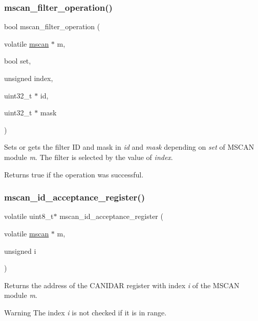 \subsubsection{\texorpdfstring{mscan\_filter\_operation()}{mscan\_filter\_operation()}}
{\footnotesize\ttfamily bool mscan\+\_\+filter\+\_\+operation (\begin{DoxyParamCaption}\item[{volatile \mbox{\hyperlink{group__RTEMSBSPsPowerPCGen5200MSCAN_gacfd56a4a482c5e7da2cff003284b2d51}{mscan}} $\ast$}]{m,  }\item[{bool}]{set,  }\item[{unsigned}]{index,  }\item[{uint32\+\_\+t $\ast$}]{id,  }\item[{uint32\+\_\+t $\ast$}]{mask }\end{DoxyParamCaption})}



Sets or gets the filter ID and mask in {\itshape id} and {\itshape mask} depending on {\itshape set} of M\+S\+C\+AN module {\itshape m}. The filter is selected by the value of {\itshape index}. 

Returns true if the operation was successful. \mbox{\label{group__RTEMSBSPsPowerPCGen5200MSCAN_gadfc7768cf5d070c658a72c4c4a52ec48}} 
\subsubsection{\texorpdfstring{mscan\_id\_acceptance\_register()}{mscan\_id\_acceptance\_register()}}
{\footnotesize\ttfamily volatile uint8\+\_\+t$\ast$ mscan\+\_\+id\+\_\+acceptance\+\_\+register (\begin{DoxyParamCaption}\item[{volatile \mbox{\hyperlink{group__RTEMSBSPsPowerPCGen5200MSCAN_gacfd56a4a482c5e7da2cff003284b2d51}{mscan}} $\ast$}]{m,  }\item[{unsigned}]{i }\end{DoxyParamCaption})}



Returns the address of the C\+A\+N\+I\+D\+AR register with index {\itshape i} of the M\+S\+C\+AN module {\itshape m}. 

\begin{DoxyWarning}{Warning}
The index {\itshape i} is not checked if it is in range. 
\end{DoxyWarning}
\mbox{\label{group__RTEMSBSPsPowerPCGen5200MSCAN_ga59f5c272b5395fa083348d087fd4c34e}} 
